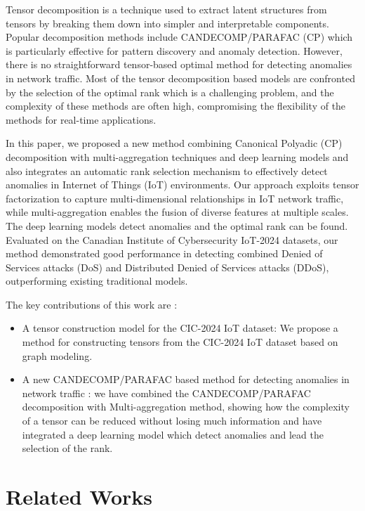 \documentclass[preprint,12pt,authoryear]{elsarticle}
\begin{document}
Tensor decomposition is a technique used to extract latent structures from tensors by breaking them down into simpler and interpretable components. Popular decomposition methods include CANDECOMP/PARAFAC (CP) \citep{kolda2009tensor} which is particularly effective for pattern discovery and anomaly detection.
However, there is no straightforward tensor-based optimal method for detecting anomalies in network traffic. Most of the tensor decomposition based models are confronted by the selection of the optimal rank which is a challenging problem, and the complexity of these methods are often high, compromising the flexibility of the methods for real-time applications.


In this paper, we proposed a new method combining Canonical Polyadic (CP) decomposition with multi-aggregation techniques and deep learning models and also integrates an automatic rank selection mechanism to effectively detect anomalies in Internet of Things (IoT) environments. Our approach exploits tensor factorization to capture multi-dimensional relationships in IoT network traffic, while multi-aggregation enables the fusion of diverse features at multiple scales. The deep learning models detect anomalies and the optimal rank can be found. Evaluated on the Canadian Institute of Cybersecurity IoT-2024 datasets, our method demonstrated good performance in detecting combined Denied of Services attacks (DoS) and Distributed Denied of Services attacks (DDoS), outperforming existing traditional models.

 
The key contributions of this work are :
\begin{itemize}
    \item A tensor construction model for the CIC-2024 IoT dataset: We propose a method for constructing tensors from the CIC-2024 IoT dataset based on graph modeling.
    
    \item A new CANDECOMP/PARAFAC based method for detecting anomalies in network traffic : we have combined the CANDECOMP/PARAFAC decomposition with Multi-aggregation method, showing how the complexity of a tensor can be reduced without losing much information and have integrated a deep learning model which detect anomalies and lead the selection of the rank.

\end{itemize}

\section{Related Works}
\end{document}

